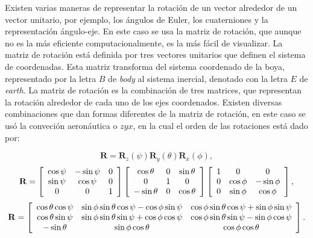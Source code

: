 \documentclass[11pt]{article}
\begin{document}
Existen varias maneras de representar la rotación de un vector alrededor de un
vector unitario, por ejemplo, los ángulos de Euler, los cuaterniones y la
representación ángulo-eje. En este caso se usa la matriz de rotación, que aunque
no es la más eficiente computacionalmente, es la más fácil de visualizar. La
matriz de rotación está definida por tres vectores unitarios que definen el
sistema de coordenadas. Esta matriz transforma del sistema coordenado de la
boya, representado por la letra $B$ de \emph{body} al sistema inercial, denotado
con la letra $E$ de \emph{earth}. La matriz de rotación es la combinación de
tres matrices, que representan la rotación alrededor de cada uno de los ejes
coordenados. Existen diversas combinaciones que dan formas diferentes de la
matriz de rotación, en este caso se usó la conveción aeronáutica o $zyx$, en la
cual el orden de las rotaciones está dado por:

\begin{equation}
  \mathbf{R} = \mathbf{R}_z(\psi) \mathbf{R}_y(\theta) \mathbf{R}_x(\phi),
\end{equation}
%
\begin{equation}
  \mathbf{R} =
  \left[
    \begin{array}{c c c}
      \cos{\psi} & -\sin{\psi} & 0 \\
      \sin{\psi} &  \cos{\psi} & 0 \\
      0          & 0           & 1
    \end{array}
  \right]
  \left[
    \begin{array}{c c c}
      \cos{\theta}  & 0 & \sin{\theta} \\
      0             & 1 & 0            \\
      -\sin{\theta} & 0 & \cos{\theta}
    \end{array}
  \right]
  \left[
    \begin{array}{c c c}
      1 & 0 & 0 \\
      0 & \cos{\phi} & -\sin{\phi} \\
      0 & \sin{\phi} &  \cos{\phi} \\
    \end{array}
  \right],
\end{equation}
%
\begin{equation}
  \mathbf{R} = \left[
    \begin{array}{c c c}
      \cos{\theta}\cos{\psi} &
      \sin{\phi}\sin{\theta}\cos{\psi} - \cos{\phi}\sin{\psi} &
      \cos{\phi}\sin{\theta}\cos{\psi} + \sin{\phi}\sin{\psi} \\
      \cos{\theta}\sin{\psi} &
      \sin{\phi}\sin{\theta}\sin{\psi} + \cos{\phi}\cos{\psi} &
      \cos{\phi}\sin{\theta}\sin{\psi} - \sin{\phi}\cos{\psi} \\
      -\sin{\theta} &
      \sin{\phi}\cos{\theta} &
      \cos{\phi}\cos{\theta} \\
    \end{array}
  \right].
  \label{eq:rotation_matrix}
\end{equation}
\end{document}
